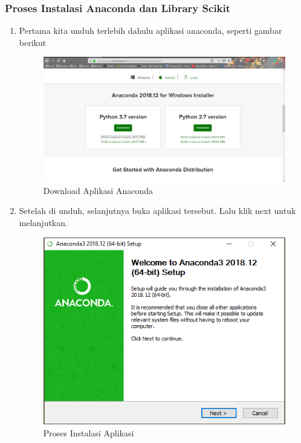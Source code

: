 \subsubsection{Proses Instalasi Anaconda dan Library Scikit}
\begin{enumerate}
\item Pertama kita unduh terlebih dahulu aplikasi anaconda, seperti gambar berikut
\begin{figure}[ht]
\centering
\includegraphics[scale=0.3]{figures/1.png}
\caption{Download Aplikasi Anaconda}
\end{figure}

\item Setelah di unduh, selanjutnya buka aplikasi tersebut. Lalu klik next untuk melanjutkan.
\begin{figure}[ht]
\centering
\includegraphics[scale=0.7]{figures/2.png}
\caption{Proses Instalasi Aplikasi}
\end{figure}


\end{enumerate}
